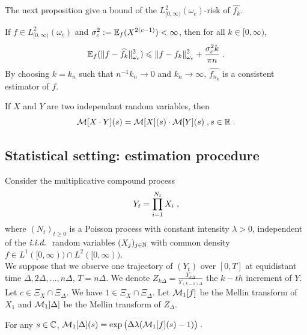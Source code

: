 The next proposition give a bound of the $L^2_{[0, \infty)}(\omega_c)$-risk of $\hat{f_k}$. 
\begin{proposition}
    If $f \in L^2_{[0, \infty)}(\omega_c)$ and $\sigma_c^2:= \mathbb{E}_f(X^{2(c-1)}) < \infty$, then for all $k \in [0, \infty)$,
    \begin{equation*}
        \mathbb{E}_f(\| f - \widehat{f_k}\|^2_{\omega_c}) \leqslant \| f - f_k\|^2_{\omega_c} + \frac{\sigma_c^2 k}{\pi n}
        \; .
    \end{equation*}
By choosing $k = k_n$ such that $n^{-1}k_n \to 0$ and $k_n \to \infty$, $\hat{f_{n_k}}$ is a consistent estimator of $f$. 
\end{proposition}

If $X$ and $Y$ are two independant random variables, then 
    \begin{equation*}
        \mathcal{M}[X \cdot Y](s) = \mathcal{M}[X](s) \cdot \mathcal{M}[Y](s)
        \; ,
        s \in \mathbb{R} 
        \; .
    \end{equation*}
\subsection{Statistical setting: estimation procedure}\label{s:model}
Consider the multiplicative compound process
\begin{equation}
    Y_t = \prod_{i = 1}^{N_t}X_i
    \; ,
    \label{multCompound}
\end{equation}
where $(N_t)_{t\geq0}$ is a Poisson process with constant intensity 
$\lambda > 0$, independent of the $\textit{i.i.d.}\;$ random variables $(X_j)_{j \in \mathbb{N}}$ with common density $f \in L^1([0, \infty)) \cap L^2([0, \infty))$.\\ 

We suppose that we observe one trajectory of $(Y_t)$ over $[0,T]$ at equidistant time $\Delta, 2 \Delta, \ldots, n\Delta$, $T = n\Delta$.  
We denote $Z_{k\Delta} = \frac{Y_{k\Delta}}{Y_{{(k-1)}\Delta}}$ the $k-th$ increment of $Y$. \\

Let $c \in \Xi_X \cap \Xi_\Delta$. We have $1 \in \Xi_X \cap \Xi_\Delta$. Let
$\mathcal{M}_1[f]$ be the Mellin transform of $X_1$ and $\mathcal{M}_1[\Delta]$ be the Mellin transform of $Z_\Delta$. 

\begin{lemma}
\label{L:kintchine}
For any $s \in \mathbb{C}$, \; $
    \mathcal{M}_1[\Delta](s) = \exp\big(\Delta \lambda(\mathcal{M}_1[f](s)-1)\big)
    \; .$
\end{lemma}

